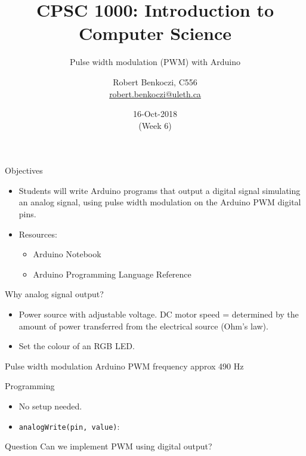 \documentclass[aspectratio=1610]{beamer}
\title %
{CPSC 1000: Introduction to Computer Science}
\subtitle{Pulse width modulation (PWM) with Arduino} %
\author{Robert Benkoczi, C556\\\url{robert.benkoczi@uleth.ca}}
\date{16-Oct-2018\\(Week 6)}
\begin{document}
\begin{frame}[plain]
\titlepage
\end{frame}


\begin{frame}[t,plain]{Objectives}
\begin{itemize}
\item Students will write Arduino
  programs that output a digital signal simulating an analog signal,
  using pulse width modulation on the Arduino PWM digital pins.
\item  Resources: 
\begin{itemize}
\item Arduino Notebook 
\item Arduino Programming Language
  Reference
\end{itemize}
\end{itemize}
\end{frame}


\begin{frame}[plain,t]{Why analog signal output?}

\begin{itemize}
\item<1> Power source with adjustable voltage. DC motor speed =
  determined by the amount of power transferred from the electrical
  source (Ohm's law).

\item<2> Set the colour of an RGB LED.

\end{itemize}
\end{frame}



\begin{frame}[plain,t]{Pulse width modulation}
Arduino PWM frequency approx 490 Hz
\end{frame}


\begin{frame}[plain,t]{Programming}
\begin{itemize}
\item No setup needed.

\item \lstinline$analogWrite(pin, value)$:
\end{itemize}
\end{frame}


\begin{frame}[plain,t]{Question}
Can we implement PWM using digital output?
\end{frame}
\end{document}
